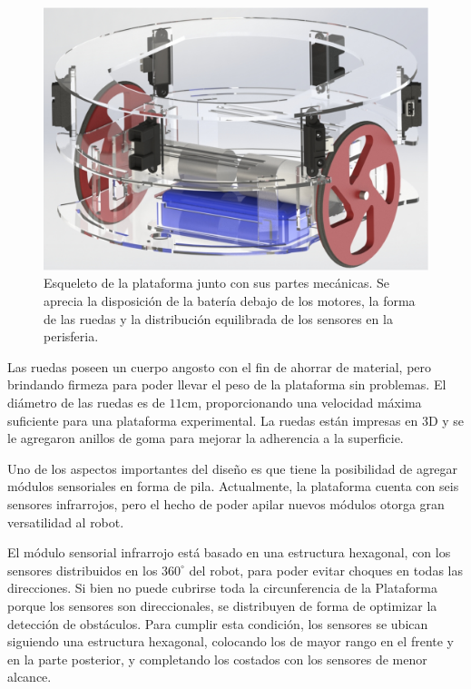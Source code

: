 \documentclass[conference,a4paper,9pt]{IEEEtran}
\begin{document}
\begin{figure}%
\centering\includegraphics[width=\columnwidth]{render.eps}%
\caption{Esqueleto de la plataforma junto con sus partes mecánicas. Se aprecia la disposición de la batería debajo de los motores, la forma de las ruedas y la distribución equilibrada de los sensores en la perisferia.}%
\label{render}%
\end{figure}

Las ruedas poseen un cuerpo angosto con el fin de ahorrar de material, pero brindando firmeza para poder llevar el peso de la plataforma sin problemas. El diámetro de las ruedas es de $11\mathrm{cm}$, proporcionando una velocidad máxima suficiente para una plataforma experimental. La ruedas están impresas en 3D y se le agregaron anillos de goma para mejorar la adherencia a la superficie.

Uno de los aspectos importantes del diseño es que tiene la posibilidad de agregar módulos sensoriales en forma de pila. Actualmente, la plataforma cuenta con seis sensores infrarrojos, pero el hecho de poder apilar nuevos módulos otorga gran versatilidad al robot.

El módulo sensorial infrarrojo está basado en una estructura hexagonal, con los sensores distribuidos en los $360^\circ$ del robot, para poder evitar choques en todas las direcciones. Si bien no puede cubrirse toda la circunferencia de la Plataforma porque los sensores son direccionales, se distribuyen de forma de optimizar la detección de obstáculos. Para cumplir esta condición, los sensores se ubican siguiendo una estructura hexagonal, colocando los de mayor rango en el frente y en la parte posterior, y completando los costados con los sensores de menor alcance.
\end{document}
